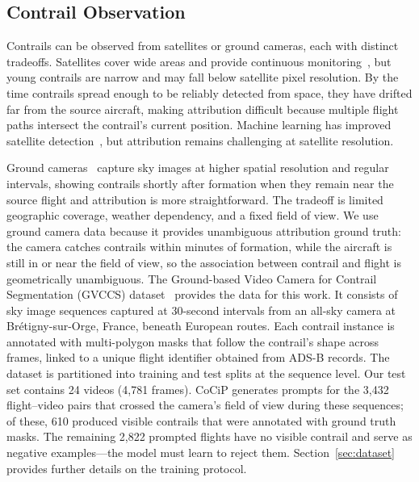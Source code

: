 \documentclass[review]{elsarticle}
\begin{document}
\subsection{Contrail Observation}
\label{sec:contrail_observation}

Contrails can be observed from satellites or ground cameras, each with distinct tradeoffs. Satellites cover wide areas and provide continuous monitoring~\cite{mannstein1999operational}, but young contrails are narrow and may fall below satellite pixel resolution. By the time contrails spread enough to be reliably detected from space, they have drifted far from the source aircraft, making attribution difficult because multiple flight paths intersect the contrail's current position. Machine learning has improved satellite detection~\cite{ng2023opencontrails}, but attribution remains challenging at satellite resolution.

Ground cameras~\cite{low2025ground, van2025contrail, jarry2025gvccs} capture sky images at higher spatial resolution and regular intervals, showing contrails shortly after formation when they remain near the source flight and attribution is more straightforward. The tradeoff is limited geographic coverage, weather dependency, and a fixed field of view. We use ground camera data because it provides unambiguous attribution ground truth: the camera catches contrails within minutes of formation, while the aircraft is still in or near the field of view, so the association between contrail and flight is geometrically unambiguous. The Ground-based Video Camera for Contrail Segmentation (GVCCS) dataset~\cite{jarry2025gvccs} provides the data for this work. It consists of sky image sequences captured at 30-second intervals from an all-sky camera at Br\'{e}tigny-sur-Orge, France, beneath European routes. Each contrail instance is annotated with multi-polygon masks that follow the contrail's shape across frames, linked to a unique flight identifier obtained from ADS-B records. The dataset is partitioned into training and test splits at the sequence level. Our test set contains 24 videos (4,781 frames). CoCiP generates prompts for the 3,432 flight--video pairs that crossed the camera's field of view during these sequences; of these, 610 produced visible contrails that were annotated with ground truth masks. The remaining 2,822 prompted flights have no visible contrail and serve as negative examples---the model must learn to reject them. Section~\ref{sec:dataset} provides further details on the training protocol.
\end{document}
